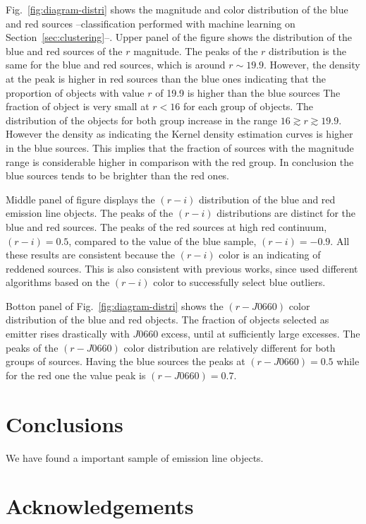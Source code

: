 \documentclass[fleqn,usenatbib]{mnras}
\begin{document}
{Fig.~\ref{fig:diagram-distri} shows the magnitude and color distribution of the blue and red
sources --classification performed with machine learning on Section~\ref{sec:clustering}--.
Upper panel of the figure shows the distribution of the blue and red sources of the $r$ magnitude.
The peaks of the $r$ distribution is the same for the blue and red sources, which is around
$r \sim 19.9$. However, the density at the peak is higher in red sources than the blue ones
indicating that the proportion of objects with value $r$ of 19.9 is higher than the blue sources
The fraction of object is very small at $r < 16$ for each group of objects.
The distribution of the objects for both group increase in the range $16 \gtrsim r \gtrsim 19.9$.
However the density as indicating the Kernel density estimation curves is higher in the
blue sources. This implies that the fraction of sources with the magnitude range is considerable
higher in comparison with the red group. In conclusion the blue sources tends to be brighter
than the red ones.


Middle panel of figure displays the $(r - i)$ distribution of the blue and red emission line
objects. The peaks of the $(r - i)$ distributions are distinct for the blue and red sources.
The peaks of the red sources at high red continuum,  $(r - i) = 0.5$, compared to the value
of the blue sample, $(r - i) = -0.9$. All these results are consistent because the $(r - i)$
color is an indicating of reddened sources. This is also consistent with previous works,
since \citet{Wevers:2017} used different algorithms based on the  $(r - i)$ color
to successfully select blue outliers.

Botton panel of Fig.~\ref{fig:diagram-distri} shows the
$(r - J0660)$ color distribution of the blue and red objects.  The fraction of objects selected
as emitter rises drastically with $J$0660 excess, until at sufficiently large excesses. The peaks
of the $(r - J0660)$ color distribution are relatively different for both groups of sources.
Having the blue sources the peaks at  $(r - J0660) = 0.5$ while for the red one the value peak
is $(r - J0660)=0.7$.


\section{Conclusions}

We have found a important sample of emission line objects. 

\section*{Acknowledgements}


}
\end{document}
